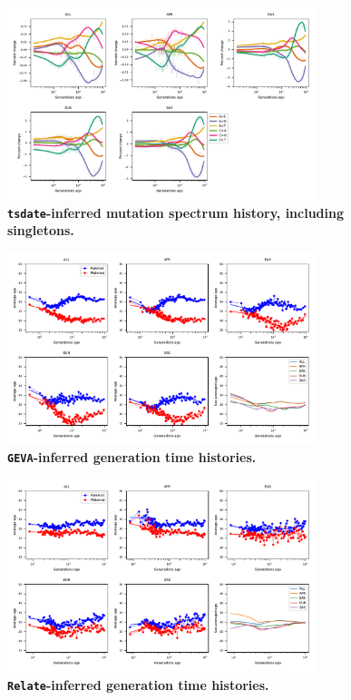 \documentclass[]{article}
\newcommand{\GEVA}{\texttt{GEVA}\xspace}
\newcommand{\tsdate}{\texttt{tsdate}\xspace}
\newcommand{\relate}{\texttt{Relate}\xspace}
\begin{document}
\begin{figure}[ht!]
    \centering
    \includegraphics[width=0.8\textwidth]{../plots/spectrum_history.tsdate.max_age.10000.singletons.pdf}
    \caption{
        \textbf{\tsdate-inferred mutation spectrum history, including singletons.}
    }
    \label{fig:tsdate-spectra-singletons}
\end{figure}


\begin{figure}[ht!]
    \centering
    \includegraphics[width=0.8\textwidth]{../plots/inferred_generation_times.geva.max_age.10000.pdf}
    \caption{
        \textbf{\GEVA-inferred generation time histories.}
    }
    \label{fig:geva-gen-times}
\end{figure}


\begin{figure}[ht!]
    \centering
    \includegraphics[width=0.8\textwidth]{../plots/inferred_generation_times.relate.pdf}
    \caption{
        \textbf{\relate-inferred generation time histories.}
    }
    \label{fig:relate-gen-times}
\end{figure}
\end{document}
